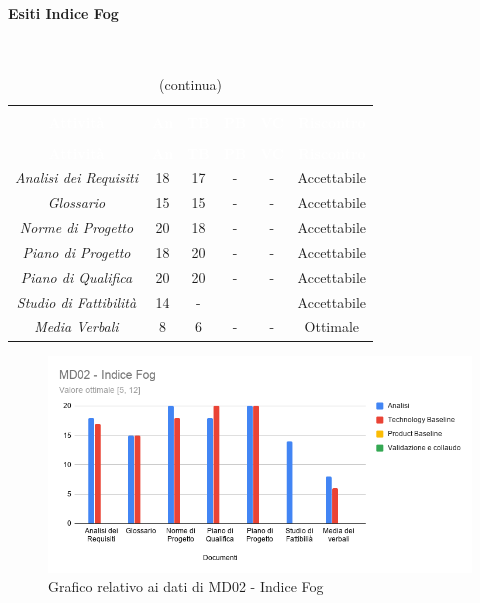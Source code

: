 \paragraph{Esiti Indice Fog} \mbox{} \\
\begin{longtable}{c c c c c c}
\rowcolor{white}\caption{Tabella Indice Fog} \\
		\rowcolor{redafk}
\textcolor{white}{\textbf{Attività}} &
\textcolor{white}{\textbf{An}} &
\textcolor{white}{\textbf{TB}} &
\textcolor{white}{\textbf{PB}} &
\textcolor{white}{\textbf{VC}} &
\textcolor{white}{\textbf{Riscontro}}  \\
		\endfirsthead
		\rowcolor{white}\caption[]{(continua)} \\
		\rowcolor{redafk}
\textcolor{white}{\textbf{Attività}} &
\textcolor{white}{\textbf{An}} &
\textcolor{white}{\textbf{TB}} &
\textcolor{white}{\textbf{PB}} &
\textcolor{white}{\textbf{VC}} &
\textcolor{white}{\textbf{Riscontro}}  \\
		\endhead
\textit{Analisi dei Requisiti} & 18 & 17 & - & - & Accettabile\\
\textit{Glossario} & 15 & 15 & - & - & Accettabile \\
\textit{Norme di Progetto} & 20 & 18 & - & - & Accettabile\\
\textit{Piano di Progetto} & 18 & 20 & - & - & Accettabile\\
\textit{Piano di Qualifica} & 20 & 20 & - & - & Accettabile\\
\textit{Studio di Fattibilità} & 14 & - & & & Accettabile\\
\textit{Media Verbali} & 8 & 6 & - & - & Ottimale\\
\end{longtable}

\begin{figure}[H]
\centering
\includegraphics[scale=0.5]{./img/MD02_fog.png}
\caption{Grafico relativo ai dati di MD02 - Indice Fog}
\end{figure}

